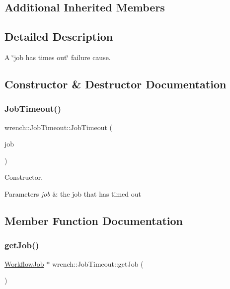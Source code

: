 \subsection*{Additional Inherited Members}


\subsection{Detailed Description}
A \char`\"{}job has times out\char`\"{} failure cause. 

\subsection{Constructor \& Destructor Documentation}
\mbox{\label{classwrench_1_1_job_timeout_a352548111a16343238a1376913e80bc6}} 
\subsubsection{\texorpdfstring{Job\+Timeout()}{JobTimeout()}}
{\footnotesize\ttfamily wrench\+::\+Job\+Timeout\+::\+Job\+Timeout (\begin{DoxyParamCaption}\item[{\hyperlink{classwrench_1_1_workflow_job}{Workflow\+Job} $\ast$}]{job }\end{DoxyParamCaption})}



Constructor. 


\begin{DoxyParams}{Parameters}
{\em job} & the job that has timed out \\
\hline
\end{DoxyParams}


\subsection{Member Function Documentation}
\mbox{\label{classwrench_1_1_job_timeout_a6c3fdde31850803e7eb2e159be735880}} 
\subsubsection{\texorpdfstring{get\+Job()}{getJob()}}
{\footnotesize\ttfamily \hyperlink{classwrench_1_1_workflow_job}{Workflow\+Job} $\ast$ wrench\+::\+Job\+Timeout\+::get\+Job (\begin{DoxyParamCaption}{ }\end{DoxyParamCaption})}



